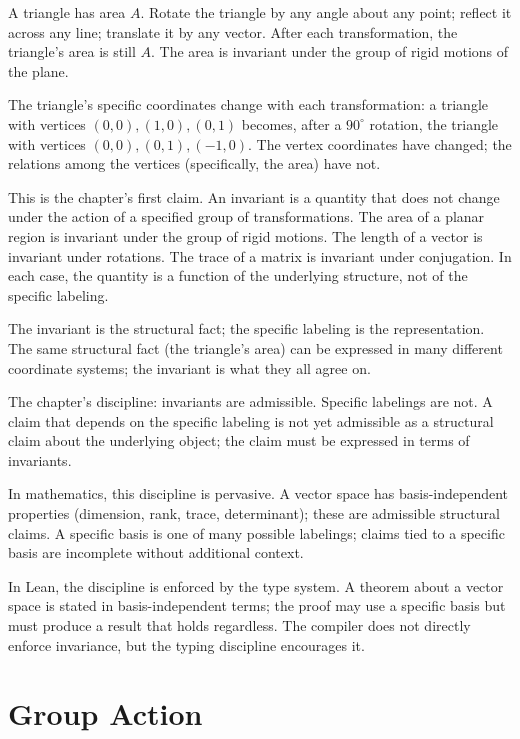 A triangle has area $A$. Rotate the triangle by any angle about any
point; reflect it across any line; translate it by any vector. After
each transformation, the triangle's area is still $A$. The area is
invariant under the group of rigid motions of the plane.

The triangle's specific coordinates change with each transformation:
a triangle with vertices $(0, 0), (1, 0), (0, 1)$ becomes, after a
$90^\circ$ rotation, the triangle with vertices $(0, 0), (0, 1),
(-1, 0)$. The vertex coordinates have changed; the relations among
the vertices (specifically, the area) have not.

This is the chapter's first claim. An invariant is a quantity that
does not change under the action of a specified group of
transformations. The area of a planar region is invariant under the
group of rigid motions. The length of a vector is invariant under
rotations. The trace of a matrix is invariant under conjugation. In
each case, the quantity is a function of the underlying structure,
not of the specific labeling.

The invariant is the structural fact; the specific labeling is the
representation. The same structural fact (the triangle's area) can
be expressed in many different coordinate systems; the invariant is
what they all agree on.

The chapter's discipline: invariants are admissible. Specific
labelings are not. A claim that depends on the specific labeling is
not yet admissible as a structural claim about the underlying
object; the claim must be expressed in terms of invariants.

In mathematics, this discipline is pervasive. A vector space has
basis-independent properties (dimension, rank, trace, determinant);
these are admissible structural claims. A specific basis is one of
many possible labelings; claims tied to a specific basis are
incomplete without additional context.

In Lean, the discipline is enforced by the type system. A theorem
about a vector space is stated in basis-independent terms; the
proof may use a specific basis but must produce a result that
holds regardless. The compiler does not directly enforce
invariance, but the typing discipline encourages it.

\section{Group Action}
\label{se:group-action}

